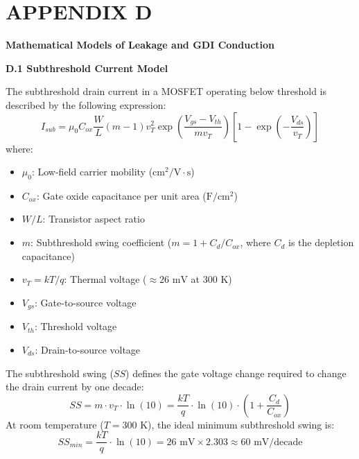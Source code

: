 \documentclass[12pt,a4paper,oneside]{report}
\begin{document}
\clearpage
\chapter*{APPENDIX D}

\noindent\textbf{Mathematical Models of Leakage and GDI Conduction}

\vspace{0.5cm}

\noindent\textbf{D.1 Subthreshold Current Model}

\noindent The subthreshold drain current in a MOSFET operating below threshold is described by the following expression:
\begin{equation}
I_{sub} = \mu_0 C_{ox} \frac{W}{L} (m-1) v_T^2 \exp\left(\frac{V_{gs} - V_{th}}{m v_T}\right) \left[1 - \exp\left(-\frac{V_{ds}}{v_T}\right)\right]
\end{equation}
where:
\begin{itemize}
\item $\mu_0$: Low-field carrier mobility ($\text{cm}^2/\text{V}\cdot\text{s}$)
\item $C_{ox}$: Gate oxide capacitance per unit area ($\text{F}/\text{cm}^2$)
\item $W/L$: Transistor aspect ratio
\item $m$: Subthreshold swing coefficient ($m = 1 + C_d/C_{ox}$, where $C_d$ is the depletion capacitance)
\item $v_T = kT/q$: Thermal voltage ($\approx 26\text{ mV}$ at $300\text{ K}$)
\item $V_{gs}$: Gate-to-source voltage
\item $V_{th}$: Threshold voltage
\item $V_{ds}$: Drain-to-source voltage
\end{itemize}

The subthreshold swing ($SS$) defines the gate voltage change required to change the drain current by one decade:
\begin{equation}
SS = m \cdot v_T \cdot \ln(10) = \frac{kT}{q} \cdot \ln(10) \cdot \left(1 + \frac{C_d}{C_{ox}}\right)
\end{equation}
At room temperature ($T = 300\text{ K}$), the ideal minimum subthreshold swing is:
\begin{equation}
SS_{min} = \frac{kT}{q} \cdot \ln(10) = 26\text{ mV} \times 2.303 \approx 60\text{ mV/decade}
\end{equation}
\end{document}

